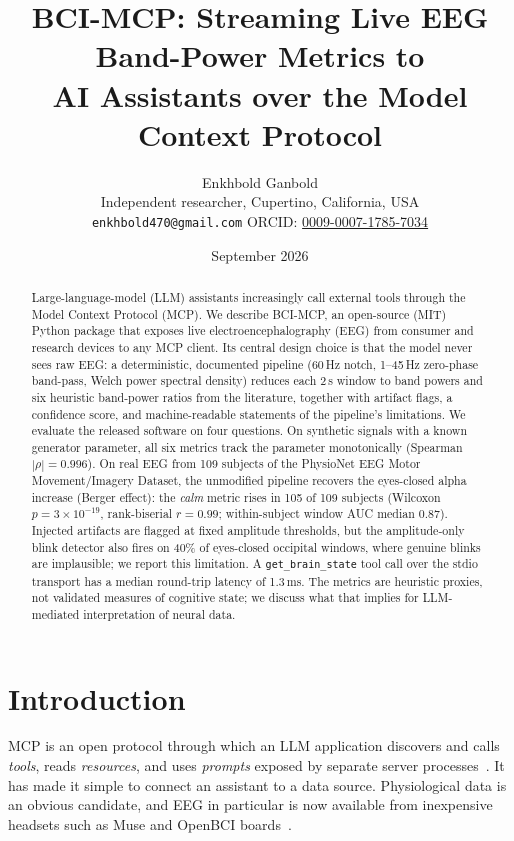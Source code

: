 \documentclass[10pt,twocolumn,letterpaper]{article}
\title{\textbf{BCI-MCP: Streaming Live EEG Band-Power Metrics to\\AI Assistants over the Model Context Protocol}}
\author{Enkhbold Ganbold\\
\small Independent researcher, Cupertino, California, USA\\
\small \texttt{enkhbold470@gmail.com} \quad ORCID: \href{https://orcid.org/0009-0007-1785-7034}{0009-0007-1785-7034}}
\date{September 2026}
\begin{document}
\maketitle

\begin{abstract}
Large-language-model (LLM) assistants increasingly call external tools through
the Model Context Protocol (MCP). We describe BCI-MCP, an open-source (MIT)
Python package that exposes live electroencephalography (EEG) from consumer and
research devices to any MCP client. Its central design choice is that the model
never sees raw EEG: a deterministic, documented pipeline (60\,Hz notch,
1--45\,Hz zero-phase band-pass, Welch power spectral density) reduces each 2\,s
window to band powers and six heuristic band-power ratios from the literature,
together with artifact flags, a confidence score, and machine-readable
statements of the pipeline's limitations. We evaluate the released software on
four questions. On synthetic signals with a known generator parameter, all six
metrics track the parameter monotonically (Spearman $|\rho| = 0.996$). On real
EEG from 109 subjects of the PhysioNet EEG Motor Movement/Imagery Dataset, the
unmodified pipeline recovers the eyes-closed alpha increase (Berger effect): the
\emph{calm} metric rises in 105 of 109 subjects (Wilcoxon $p = 3\times10^{-19}$,
rank-biserial $r = 0.99$; within-subject window AUC median 0.87). Injected
artifacts are flagged at fixed amplitude thresholds, but the amplitude-only blink
detector also fires on 40\% of eyes-closed occipital windows, where genuine blinks
are implausible; we report this limitation. A \texttt{get\_brain\_state} tool call over the stdio
transport has a median round-trip latency of 1.3\,ms. The metrics are heuristic
proxies, not validated measures of cognitive state; we discuss what that
implies for LLM-mediated interpretation of neural data.
\end{abstract}

\section{Introduction}

MCP is an open protocol through which an LLM application discovers and calls
\emph{tools}, reads \emph{resources}, and uses \emph{prompts} exposed by
separate server processes~\citep{mcpspec}. It has made it simple to connect an
assistant to a data source. Physiological data is an obvious candidate, and EEG
in particular is now available from inexpensive headsets such as Muse and OpenBCI
boards~\citep{krigolson2017}.
\end{document}

